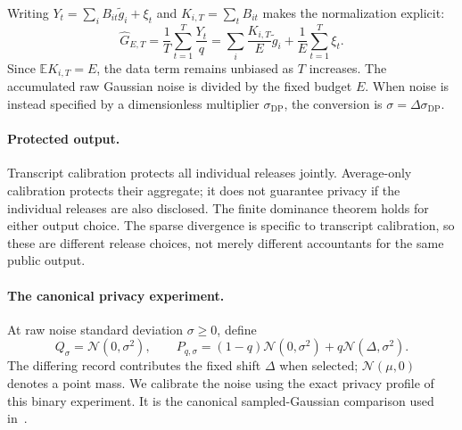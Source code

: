 \documentclass[11pt]{article}
\theoremstyle{remark}
\newcommand{\E}{\mathbb E}
\newcommand{\Normal}{\mathcal N}
\begin{document}
Writing $Y_t=\sum_i B_{it}\widetilde g_i+\xi_t$ and
$K_{i,T}=\sum_t B_{it}$ makes the normalization explicit:
\begin{equation}\label{eq:participation-decomposition}
 \widehat G_{E,T}=\frac1T\sum_{t=1}^T\frac{Y_t}{q}
 =\sum_i\frac{K_{i,T}}E\widetilde g_i+\frac1E\sum_{t=1}^T\xi_t.
\end{equation}
Since $\E K_{i,T}=E$, the data term remains unbiased as $T$ increases.
The accumulated raw Gaussian noise is divided by the fixed budget $E$.
When noise is instead specified by a dimensionless multiplier
$\sigma_{\mathrm{DP}}$, the conversion is $\sigma=\Delta\sigma_{\mathrm{DP}}$.

\paragraph{Protected output.}
Transcript calibration protects all individual releases jointly.
Average-only calibration protects their aggregate; it does not guarantee
privacy if the individual releases are also disclosed. The finite dominance
theorem holds for either output choice. The sparse divergence is specific
to transcript calibration, so these are different release choices, not
merely different accountants for the same public output.

\paragraph{The canonical privacy experiment.}
At raw noise standard deviation $\sigma\geq0$, define
\[
 Q_\sigma=\Normal(0,\sigma^2),\qquad
 P_{q,\sigma}=(1-q)\Normal(0,\sigma^2)+q\Normal(\Delta,\sigma^2).
\]
The differing record contributes the fixed shift $\Delta$ when selected;
$\Normal(\mu,0)$ denotes a point mass. We calibrate the noise using the exact
privacy profile of this binary experiment. It is the canonical sampled-Gaussian
comparison used in~\cite{raisa2024}.
\end{document}
